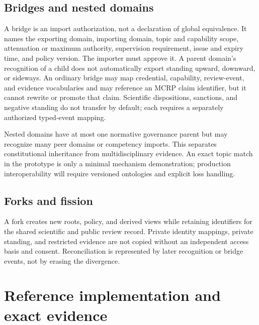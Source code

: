 \documentclass[11pt]{article}
\begin{document}
\subsection{Bridges and nested domains}

A bridge is an import authorization, not a declaration of global equivalence. It
names the exporting domain, importing domain, topic and capability scope,
attenuation or maximum authority, supervision requirement, issue and expiry time,
and policy version. The importer must approve it. A parent domain's recognition of
a child does not automatically export standing upward, downward, or sideways.
An ordinary bridge may map credential, capability, review-event, and evidence
vocabularies and may reference an MCRP claim identifier, but it cannot rewrite or
promote that claim. Scientific dispositions, sanctions, and negative standing do
not transfer by default; each requires a separately authorized typed-event mapping.

Nested domains have at most one normative governance parent but may recognize many
peer domains or competency imports. This separates constitutional inheritance from
multidisciplinary evidence. An exact topic match in the prototype is only a minimal
mechanism demonstration; production interoperability will require versioned
ontologies and explicit loss handling.

\subsection{Forks and fission}

A fork creates new roots, policy, and derived views while retaining identifiers for
the shared scientific and public review record. Private identity mappings, private
standing, and restricted evidence are not copied without an independent access
basis and consent. Reconciliation is represented by later recognition or bridge
events, not by erasing the divergence.


\section{Reference implementation and exact evidence}
\label{sec:implementation}
\end{document}
